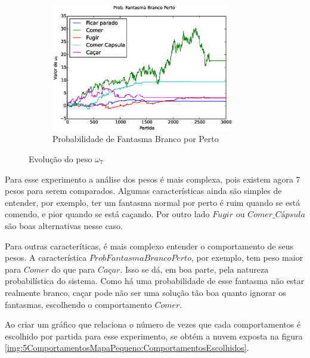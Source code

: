 \begin{figure}[h]
	\centering
	\begin{subfigure}[t]{.5\textwidth}
		\centering
		\includegraphics[width=80mm]{images/5_behaviors_small_map/weights____pol__ProbFantasmaBrancoPerto}
		\caption{Probabilidade de Fantasma Branco por Perto}
	\end{subfigure}%
	\caption{Evolução do peso $ \omega_7 $}
	\label{img:5ComportamentosMapaPequeno:PesoProbFantasmaBrancoPorPerto}
\end{figure}

Para esse experimento a análise dos pesos é mais complexa, pois existem agora 7 pesos para serem comparados. Algumas características ainda são simples de entender, por exemplo, ter um fantasma normal por perto é ruim quando se está comendo, e pior quando se está caçando. Por outro lado $ Fugir $ ou $ \textit{Comer\_Cápsula} $ são boas alternativas nesse caso.

Para outras caracteríticas, é mais complexo entender o comportamento de seus pesos. A característica $ Prob Fantasma Branco Perto $, por exemplo, tem peso maior para $ Comer $ do que para $ \textit{Caçar} $. Isso se dá, em boa parte, pela natureza probabilística do sistema. Como há uma probabilidade de esse fantasma não estar realmente branco, caçar pode não ser uma solução tão boa quanto ignorar os fantasmas, escolhendo o comportamento $ Comer $.

Ao criar um gráfico que relaciona o número de vezes que cada comportamentos é escolhido por partida para esse experimento, se obtém a nuvem exposta na figura \ref{img:5ComportamentosMapaPequeno:ComportamentosEscolhidos}.

